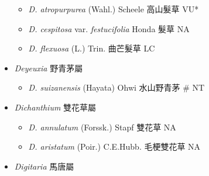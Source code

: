 \begin{itemize}
  \begin{itemize}
        \item[] \textit{D. atropurpurea} (Wahl.) Scheele  高山髮草   VU*
        \item[] \textit{D. cespitosa} var. \textit{festucifolia} Honda  髮草   NA
        \item[] \textit{D. flexuosa} (L.) Trin.  曲芒髮草   LC
  \end{itemize}
 \item[] \textit{Deyeuxia} 野青茅屬
                                
  \begin{itemize}
        \item[] \textit{D. suizanensis} (Hayata) Ohwi  水山野青茅  \# NT
  \end{itemize}
 \item[] \textit{Dichanthium} 雙花草屬
                                
  \begin{itemize}
        \item[] \textit{D. annulatum} (Forssk.) Stapf  雙花草   NA
        \item[] \textit{D. aristatum} (Poir.) C.E.Hubb.  毛梗雙花草   NA
  \end{itemize}
 \item[] \textit{Digitaria} 馬唐屬
                                

\end{itemize}
